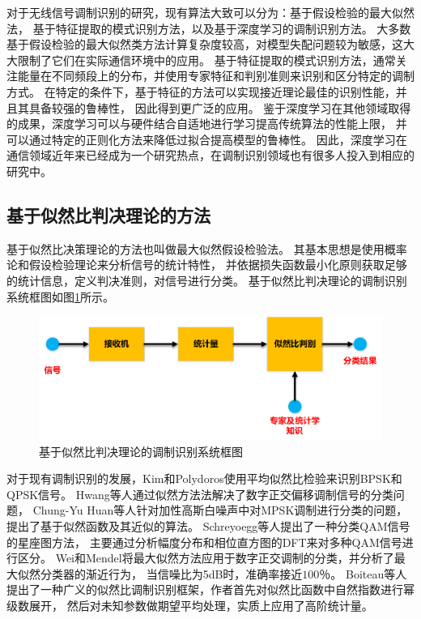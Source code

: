 对于无线信号调制识别的研究，现有算法大致可以分为：基于假设检验的最大似然法，
基于特征提取的模式识别方法，以及基于深度学习的调制识别方法。
大多数基于假设检验的最大似然类方法计算复杂度较高，对模型失配问题较为敏感，这大大限制了它们在实际通信环境中的应用。
基于特征提取的模式识别方法，通常关注能量在不同频段上的分布，并使用专家特征和判别准则来识别和区分特定的调制方式。
在特定的条件下，基于特征的方法可以实现接近理论最佳的识别性能，并且其具备较强的鲁棒性，
因此得到更广泛的应用。
鉴于深度学习在其他领域取得的成果，深度学习可以与硬件结合自适地进行学习提高传统算法的性能上限，
并可以通过特定的正则化方法来降低过拟合提高模型的鲁棒性。
因此，深度学习在通信领域近年来已经成为一个研究热点，在调制识别领域也有很多人投入到相应的研究中。\par

\subsection{基于似然比判决理论的方法}

基于似然比决策理论的方法也叫做最大似然假设检验法。 
其基本思想是使用概率论和假设检验理论来分析信号的统计特性，
并依据损失函数最小化原则获取足够的统计信息，定义判决准则，对信号进行分类。
基于似然比判决理论的调制识别系统框图如图\ref{sec:fig_1_0}所示。\par

\begin{figure}
	\centering
	\includegraphics[scale=0.55]{figures/chapter_1/fig_1_0}
	\caption{基于似然比判决理论的调制识别系统框图} \label{sec:fig_1_0}
\end{figure}

对于现有调制识别的发展，Kim和Polydoros\cite{kim1988digital}使用平均似然比检验来识别BPSK和QPSK信号。
Hwang等人通过似然方法法解决了数字正交偏移调制信号的分类问题\cite{hwang1991advanced}，
Chung-Yu Huan等人针对加性高斯白噪声中对MPSK调制进行分类的问题，
提出了基于似然函数及其近似的算法\cite{380199}。
Schreyoegg等人提出了一种分类QAM信号的星座图方法，
主要通过分析幅度分布和相位直方图的DFT来对多种QAM信号进行区分\cite{644992}。 
Wei和Mendel将最大似然方法应用于数字正交调制的分类，并分析了最大似然分类器的渐近行为，
当信噪比为5dB时，准确率接近$100％$\cite{wei2000maximum}。
Boiteau等人提出了一种广义的似然比调制识别框架，作者首先对似然比函数中自然指数进行幂级数展开，
然后对未知参数做期望平均处理，实质上应用了高阶统计量\cite{boiteau1998general}。
\par

